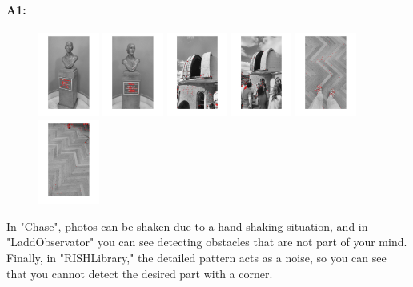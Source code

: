 \paragraph{A1:} \begin{figure}[!h]
    \centering
    \includegraphics[width=2cm]{q1_Chase1.jpg}
    \includegraphics[width=2cm]{q1_Chase2.jpg}
    \includegraphics[width=2cm]{q1_LaddObservatory1.jpg}
    \includegraphics[width=2cm]{q1_LaddObservatory2.jpg}
    \includegraphics[width=2cm]{q1_RISHLibrary1.jpg}
    \includegraphics[width=2cm]{q1_RISHLibrary2.jpg}
    \label{fig:pic1}
\end{figure}

In "Chase", photos can be shaken due to a hand shaking situation, and in "LaddObservator" you can see detecting obstacles that are not part of your mind. Finally, in "RISHLibrary," the detailed pattern acts as a noise, so you can see that you cannot detect the desired part with a corner.



